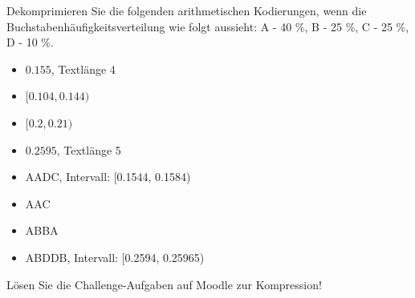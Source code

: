 \begin{myexercise}
Dekomprimieren Sie die folgenden arithmetischen Kodierungen, wenn die Buchstabenhäufigkeitsverteilung wie folgt aussieht: A - 40 \%, B - 25 \%, C - 25 \%, D - 10 \%.
\begin{itemize}
\item $0.155$, Textlänge 4
\item $[0.104, 0.144)$
\item $[0.2, 0.21)$
\item $0.2595$, Textlänge 5
\end{itemize}
\begin{myanswer}
\begin{itemize}
\item AADC, Intervall: [0.1544, 0.1584)
\item AAC
\item ABBA
\item ABDDB, Intervall: [0.2594, 0.25965)
\end{itemize}
\end{myanswer}
\end{myexercise}

\begin{mychallenge}
Lösen Sie die Challenge-Aufgaben auf Moodle zur Kompression!
\end{mychallenge}

  
